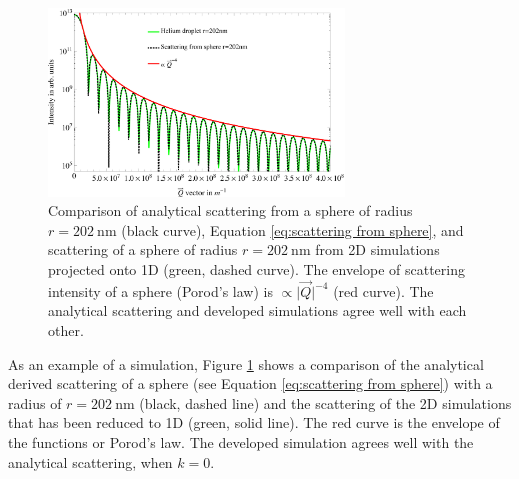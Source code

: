 \begin{figure}
	\centering
		\includegraphics[width=0.70\textwidth]{images/cluster-sphere-intact.png}
	\caption[Comparison of analytical derived scattering and numerical simulations.]{Comparison of analytical scattering from a sphere of radius $r=\SI{202}{\nano\meter}$ (black curve), Equation \eqref{eq:scattering from sphere}, and scattering of a sphere of radius $r=\SI{202}{\nano\meter}$ from 2D simulations projected onto 1D (green, dashed curve). The envelope of scattering intensity of a sphere (Porod's law) is $\propto \lvert \vec{Q}\rvert^{-4}$ (red curve). The analytical scattering and developed simulations agree well with each other.}
	\label{fig:cluster-sphere-intact-2D}
\end{figure}
As an example of a simulation, Figure \ref{fig:cluster-sphere-intact-2D} shows a comparison of the analytical derived scattering of a sphere (see Equation \eqref{eq:scattering from sphere}) with a radius of $r=\SI{202}{\nano\meter}$ (black, dashed line) and the scattering of the 2D simulations that has been reduced to 1D (green, solid line). The red curve is the envelope of the functions or Porod's law. The developed simulation agrees well with the analytical scattering, when $k=0$.
%
%
%
